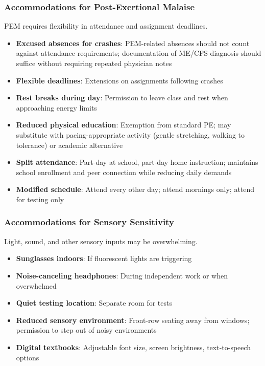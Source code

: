 \subsubsection{Accommodations for Post-Exertional Malaise}

PEM requires flexibility in attendance and assignment deadlines.

\begin{itemize}
    \item \textbf{Excused absences for crashes}: PEM-related absences should not count against attendance requirements; documentation of ME/CFS diagnosis should suffice without requiring repeated physician notes
    \item \textbf{Flexible deadlines}: Extensions on assignments following crashes
    \item \textbf{Rest breaks during day}: Permission to leave class and rest when approaching energy limits
    \item \textbf{Reduced physical education}: Exemption from standard PE; may substitute with pacing-appropriate activity (gentle stretching, walking to tolerance) or academic alternative
    \item \textbf{Split attendance}: Part-day at school, part-day home instruction; maintains school enrollment and peer connection while reducing daily demands
    \item \textbf{Modified schedule}: Attend every other day; attend mornings only; attend for testing only
\end{itemize}

\subsubsection{Accommodations for Sensory Sensitivity}

Light, sound, and other sensory inputs may be overwhelming.

\begin{itemize}
    \item \textbf{Sunglasses indoors}: If fluorescent lights are triggering
    \item \textbf{Noise-canceling headphones}: During independent work or when overwhelmed
    \item \textbf{Quiet testing location}: Separate room for tests
    \item \textbf{Reduced sensory environment}: Front-row seating away from windows; permission to step out of noisy environments
    \item \textbf{Digital textbooks}: Adjustable font size, screen brightness, text-to-speech options
\end{itemize}


